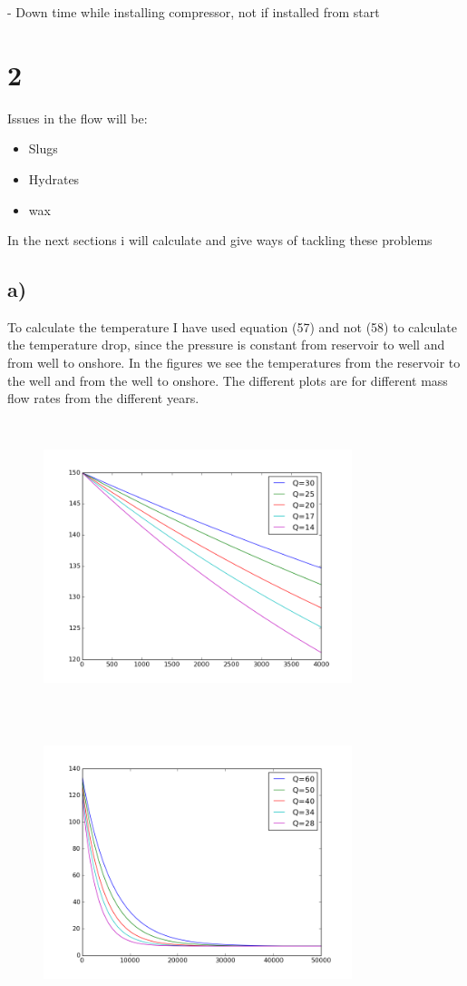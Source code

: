 \documentclass[DIV=calc, paper=a4, fontsize=13pt, twocolumn]{scrartcl}	 %
\begin{document}
- Down time while installing compressor, not if installed from start
\newpage
\section*{2}
Issues in the flow will be:
\begin{itemize}
\item Slugs
\item Hydrates
\item wax
\end{itemize}
In the next sections i will calculate and give ways of tackling these problems
\subsection*{a)}
To calculate the temperature 
I have used equation (57) and not (58) to calculate the temperature drop, since the pressure is constant from reservoir to well and from well to onshore.
In the figures we see the temperatures from the reservoir to the well and from the well to onshore. The different plots are for different mass flow rates from the different years.
\begin{figure}[h]
\includegraphics[width=9cm,height=8.5cm]{Temp1.png}
\includegraphics[width=9cm,height=8.5cm]{temp2.png}
\end{figure}
\end{document}
